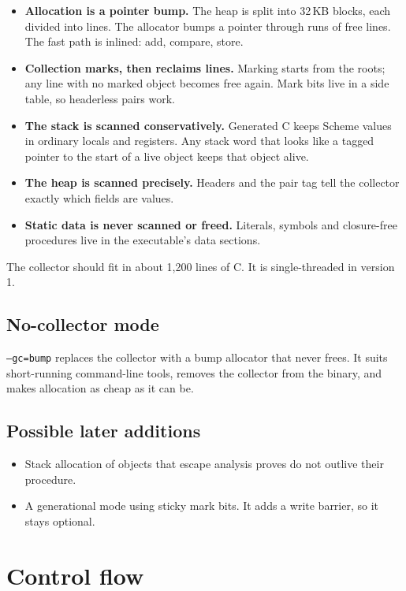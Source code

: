 \documentclass[a4paper,11pt]{article}
\begin{document}
\begin{itemize}
\item \textbf{Allocation is a pointer bump.} The heap is split into 32\,KB
  blocks, each divided into lines. The allocator bumps a pointer through
  runs of free lines. The fast path is inlined: add, compare, store.
\item \textbf{Collection marks, then reclaims lines.} Marking starts from
  the roots; any line with no marked object becomes free again. Mark bits
  live in a side table, so headerless pairs work.
\item \textbf{The stack is scanned conservatively.} Generated C keeps Scheme
  values in ordinary locals and registers. Any stack word that looks like a
  tagged pointer to the start of a live object keeps that object alive.
\item \textbf{The heap is scanned precisely.} Headers and the pair tag tell
  the collector exactly which fields are values.
\item \textbf{Static data is never scanned or freed.} Literals, symbols and
  closure-free procedures live in the executable's data sections.
\end{itemize}

The collector should fit in about 1,200 lines of C. It is single-threaded in
version 1.

\subsection{No-collector mode}

\texttt{--gc=bump} replaces the collector with a bump allocator that never
frees. It suits short-running command-line tools, removes the collector from
the binary, and makes allocation as cheap as it can be.

\subsection{Possible later additions}

\begin{itemize}
\item Stack allocation of objects that escape analysis proves do not outlive
  their procedure.
\item A generational mode using sticky mark bits. It adds a write barrier,
  so it stays optional.
\end{itemize}

\section{Control flow}
\end{document}
